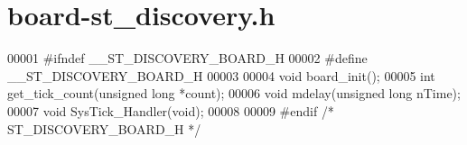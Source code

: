 \section{board-\/st\+\_\+discovery.h}
\label{board-st__discovery_8h_source}

\begin{DoxyCode}
00001 \textcolor{preprocessor}{#}\textcolor{preprocessor}{ifndef} \textcolor{preprocessor}{\_\_ST\_DISCOVERY\_BOARD\_H}
00002 \textcolor{preprocessor}{#}\textcolor{preprocessor}{define} \textcolor{preprocessor}{\_\_ST\_DISCOVERY\_BOARD\_H}
00003 
00004 \textcolor{keywordtype}{void} board_init();
00005 \textcolor{keywordtype}{int} get_tick_count(\textcolor{keywordtype}{unsigned} \textcolor{keywordtype}{long} *count);
00006 \textcolor{keywordtype}{void} mdelay(\textcolor{keywordtype}{unsigned} \textcolor{keywordtype}{long} nTime);
00007 \textcolor{keywordtype}{void} SysTick_Handler(\textcolor{keywordtype}{void});
00008 
00009 \textcolor{preprocessor}{#}\textcolor{preprocessor}{endif}  \textcolor{comment}{/* ST\_DISCOVERY\_BOARD\_H */}
\end{DoxyCode}

